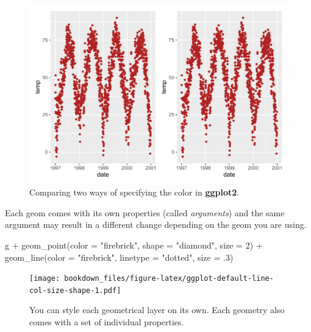 \documentclass[
]{krantz}
\makeatletter
\newenvironment{Shaded}{\begin{snugshade}}{\end{snugshade}}
\newcommand{\AttributeTok}[1]{\textcolor[rgb]{0.61,0.61,0.61}{#1}}
\newcommand{\DecValTok}[1]{\textcolor[rgb]{0.06,0.06,0.06}{#1}}
\newcommand{\FunctionTok}[1]{\textcolor[rgb]{0,0,0}{#1}}
\newcommand{\NormalTok}[1]{#1}
\newcommand{\SpecialCharTok}[1]{\textcolor[rgb]{0,0,0}{#1}}
\newcommand{\StringTok}[1]{\textcolor[rgb]{0.5,0.5,0.5}{#1}}
\newenvironment{kframe}{%
\medskip{}
\setlength{\fboxsep}{.8em}
 \def\at@end@of@kframe{}%
 \ifinner\ifhmode%
  \def\at@end@of@kframe{\end{minipage}}%
  \begin{minipage}{\columnwidth}%
 \fi\fi%
 \def\FrameCommand##1{\hskip\@totalleftmargin \hskip-\fboxsep
 \colorbox{shadecolor}{##1}\hskip-\fboxsep
     \hskip-\linewidth \hskip-\@totalleftmargin \hskip\columnwidth}%
 \MakeFramed {\advance\hsize-\width
   \@totalleftmargin\z@ \linewidth\hsize
   \@setminipage}}%
 {\par\unskip\endMakeFramed%
 \at@end@of@kframe}
\renewenvironment{Shaded}{\begin{kframe}}{\end{kframe}}
\makeatother
\begin{document}
\begin{figure}
\centering
\includegraphics{bookdown_files/figure-latex/ggplot-default-col-size-hex-rgb-plot-1.pdf}
\caption{\label{fig:ggplot-default-col-size-hex-rgb-plot}Comparing two ways of specifying the color in \textbf{ggplot2}.}
\end{figure}

Each geom comes with its own properties (called \emph{arguments}) and the same argument may result in a different change depending on the geom you are using.

\begin{Shaded}
\begin{Highlighting}[]
\NormalTok{g }\SpecialCharTok{+} \FunctionTok{geom\_point}\NormalTok{(}\AttributeTok{color =} \StringTok{"firebrick"}\NormalTok{, }\AttributeTok{shape =} \StringTok{"diamond"}\NormalTok{, }\AttributeTok{size =} \DecValTok{2}\NormalTok{) }\SpecialCharTok{+}
    \FunctionTok{geom\_line}\NormalTok{(}\AttributeTok{color =} \StringTok{"firebrick"}\NormalTok{, }\AttributeTok{linetype =} \StringTok{"dotted"}\NormalTok{, }\AttributeTok{size =}\NormalTok{ .}\DecValTok{3}\NormalTok{)}
\end{Highlighting}
\end{Shaded}

\begin{figure}
\centering
\texttt{[image: bookdown\_files/figure-latex/ggplot-default-line-col-size-shape-1.pdf]}
\caption{\label{fig:ggplot-default-line-col-size-shape}You can style each geometrical layer on its own. Each geometry also comes with a set of individual properties.}
\end{figure}
\end{document}
